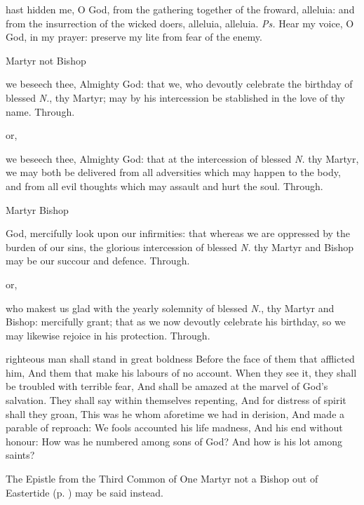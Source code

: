 \introit
{} hast hidden me, O God, from the gathering together of the froward, alleluia: and from the insurrection of the wicked doers, alleluia, alleluia. \textit{Ps.} Hear my voice, O God, in my prayer: preserve my lite from fear of the enemy.

\collect
\begin{inhead}
	Martyr not Bishop
\end{inhead}
 we beseech thee, Almighty God: that we, who devoutly celebrate the birthday of blessed \textit{N.}, thy Martyr; may by his intercession be stablished in the love of thy name. Through.
\begin{inhead}
	or,
\end{inhead}
 we beseech thee, Almighty God: that at the intercession of blessed \textit{N.} thy Martyr, we may both be delivered from all adversities which may happen to the body, and from all evil thoughts which may assault and hurt the soul. Through.

\clearpage
\begin{inhead}
	Martyr Bishop
\end{inhead}
 God, mercifully look upon our infirmities: that whereas we are oppressed by the burden of our sins, the glorious intercession of blessed \textit{N.} thy Martyr and Bishop may be our succour and defence. Through.
\begin{inhead}
	or,
\end{inhead}
 who makest us glad with the yearly solemnity of blessed \textit{N.}, thy Martyr and Bishop: mercifully grant; that as we now devoutly celebrate his birthday, so we may likewise rejoice in his protection. Through.

\label{CommonMartyrEasterEpistle}
 righteous man shall stand in great boldness Before the face of them that afflicted him, And them that make his labours of no account. When they see it, they shall be troubled with terrible fear, And shall be amazed at the marvel of God's salvation. They shall say within themselves repenting, And for distress of spirit shall they groan, This was he whom aforetime we had in derision, And made a parable of reproach: We fools accounted his life madness, And his end without honour: How was he numbered among sons of God? And how is his lot among saints?

\begin{rubric}
	The Epistle from the Third Common of One Martyr not a Bishop out of Eastertide (p. \pageref{2Timothy28}) may be said instead.
\end{rubric}

